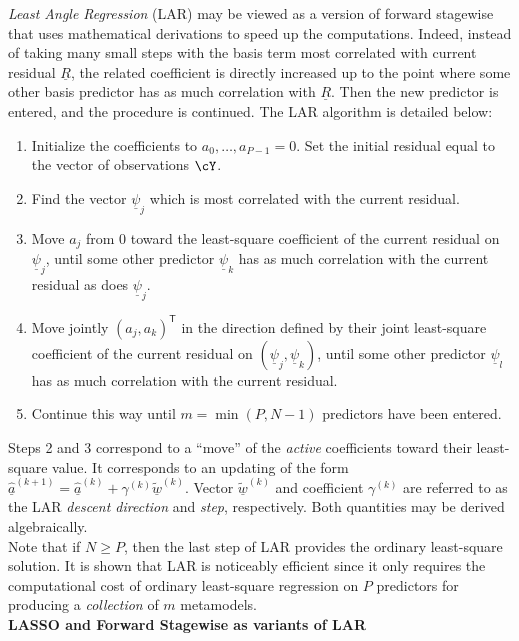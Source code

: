 {  \emph{Least Angle Regression} (LAR) may be viewed as a version of forward stagewise that uses mathematical derivations to speed up the computations. Indeed, instead of taking many small steps with the basis term most correlated with current residual $\underline{R}$, the related coefficient is directly increased up to the point where some other basis predictor has as much correlation with $\underline{R}$. Then the new predictor is entered, and the procedure is continued. The LAR algorithm is detailed below:
  \begin{enumerate}
  \item Initialize the coefficients to $a_{0},\dots,a_{P-1} = 0$. Set the initial residual equal to the vector of observations $\cY$.
  \item Find the vector $\underline{\psi}_{j}$ which is most correlated with the current residual.
  \item Move $a_{j}$ from 0 toward the least-square coefficient of the current residual on $\underline{\psi}_{j}$, until some other predictor $\underline{\psi}_{k}$ has as much correlation with the current residual as does $\underline{\psi}_{j}$.
  \item Move jointly $(a_{j} , a_{k})^{\textsf{T}}$ in the direction defined by their joint least-square coefficient of the current residual on $(\underline{\psi}_{j},\underline{\psi}_{k})$, until some other predictor $\underline{\psi}_{l}$ has as much correlation with the current residual.
  \item Continue this way until $m = \min(P,N-1)$ predictors have been entered.
  \end{enumerate}
  Steps 2 and 3 correspond to a ``move'' of the \emph{active} coefficients toward their least-square value. It corresponds to an updating of the form $\hat{\underline{a}}^{(k+1)} = \hat{\underline{a}}^{(k)} + \gamma^{(k)} \tilde{\underline{w}}^{(k)}$. Vector $\tilde{\underline{w}}^{(k)}$ and coefficient $\gamma^{(k)}$ are referred to as the LAR \emph{descent direction} and \emph{step}, respectively. Both quantities may be derived algebraically. \\

  Note that if $N \geq P$, then the last step of LAR provides the ordinary least-square solution. It is shown that LAR is noticeably efficient since it only requires the computational cost of ordinary least-square regression on $P$ predictors for producing a \emph{collection} of $m$ metamodels. \\

  \textbf{LASSO and Forward Stagewise as variants of LAR} \vspace{2mm}

}

